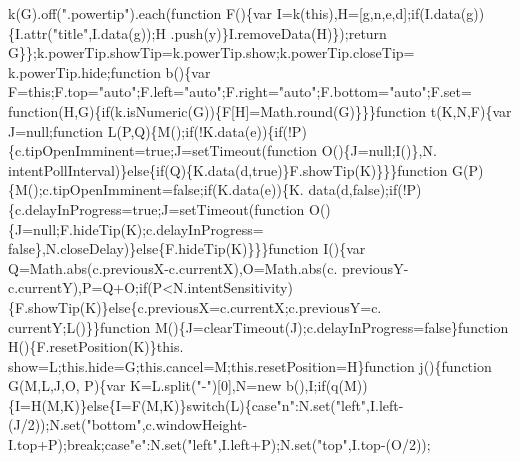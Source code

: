 \begin{DoxyCode}
{      k(G).off(\textcolor{stringliteral}{".powertip"}).each(\textcolor{keyword}{function} F()\{var I=k(\textcolor{keyword}{this}),H=[g,n,e,d];\textcolor{keywordflow}{if}(I.data(g))\{I.attr(\textcolor{stringliteral}{"title"},I.data(g));H
      .push(y)\}I.removeData(H)\});\textcolor{keywordflow}{return} G\}\};k.powerTip.showTip=k.powerTip.show;k.powerTip.closeTip=
      k.powerTip.hide;\textcolor{keyword}{function} b()\{var F=\textcolor{keyword}{this};F.top=\textcolor{stringliteral}{"auto"};F.left=\textcolor{stringliteral}{"auto"};F.right=\textcolor{stringliteral}{"auto"};F.bottom=\textcolor{stringliteral}{"auto"};F.set=\textcolor{keyword}{
      function}(H,G)\{\textcolor{keywordflow}{if}(k.isNumeric(G))\{F[H]=Math.round(G)\}\}\}\textcolor{keyword}{function} t(K,N,F)\{var J=null;\textcolor{keyword}{function} 
      L(P,Q)\{M();\textcolor{keywordflow}{if}(!K.data(e))\{\textcolor{keywordflow}{if}(!P)\{c.tipOpenImminent=\textcolor{keyword}{true};J=setTimeout(\textcolor{keyword}{function} O()\{J=null;I()\},N.
      intentPollInterval)\}\textcolor{keywordflow}{else}\{\textcolor{keywordflow}{if}(Q)\{K.data(d,\textcolor{keyword}{true})\}F.showTip(K)\}\}\}\textcolor{keyword}{function} G(P)\{M();c.tipOpenImminent=\textcolor{keyword}{false};\textcolor{keywordflow}{if}(K.data(e))\{K.
      data(d,\textcolor{keyword}{false});\textcolor{keywordflow}{if}(!P)\{c.delayInProgress=\textcolor{keyword}{true};J=setTimeout(\textcolor{keyword}{function} O()\{J=null;F.hideTip(K);c.delayInProgress=\textcolor{keyword}{
      false}\},N.closeDelay)\}\textcolor{keywordflow}{else}\{F.hideTip(K)\}\}\}\textcolor{keyword}{function} I()\{var Q=Math.abs(c.previousX-c.currentX),O=Math.abs(c.
      previousY-c.currentY),P=Q+O;\textcolor{keywordflow}{if}(P<N.intentSensitivity)\{F.showTip(K)\}\textcolor{keywordflow}{else}\{c.previousX=c.currentX;c.previousY=c.
      currentY;L()\}\}\textcolor{keyword}{function} M()\{J=clearTimeout(J);c.delayInProgress=\textcolor{keyword}{false}\}\textcolor{keyword}{function} H()\{F.resetPosition(K)\}this.
      show=L;this.hide=G;this.cancel=M;this.resetPosition=H\}\textcolor{keyword}{function} j()\{\textcolor{keyword}{function} G(M,L,J,O,
      P)\{var K=L.split(\textcolor{stringliteral}{"-"})[0],N=\textcolor{keyword}{new} b(),I;\textcolor{keywordflow}{if}(q(M))\{I=H(M,K)\}\textcolor{keywordflow}{else}\{I=F(M,K)\}\textcolor{keywordflow}{switch}(L)\{\textcolor{keywordflow}{case}\textcolor{stringliteral}{"n"}:N.set(\textcolor{stringliteral}{"left"},I.left-
      (J/2));N.set(\textcolor{stringliteral}{"bottom"},c.windowHeight-I.top+P);\textcolor{keywordflow}{break};\textcolor{keywordflow}{case}\textcolor{stringliteral}{"e"}:N.set(\textcolor{stringliteral}{"left"},I.left+P);N.set(\textcolor{stringliteral}{"top"},I.top-(O/2));\textcolor{keywordflow}{
}}
\end{DoxyCode}
